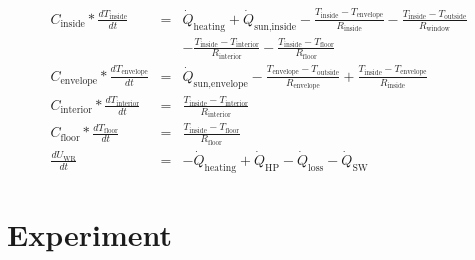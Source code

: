  \begin{align}
       \label{eq:meinModel2} 
       C_\text{inside}*\frac{d T_\text{inside}}{d t} &=& \dot{Q}_\text{heating} + \dot{Q}_\text{sun,inside} - \frac{T_\text{inside}-T_\text{envelope}}{R_\text{inside}} - \frac{T_\text{inside}-T_\text{outside}}{R_\text{window}} \\
       & &-\frac{T_\text{inside}-T_\text{interior}}{R_\text{interior}}-\frac{T_\text{inside}-T_\text{floor}}{R_\text{floor}} \nonumber\\
       C_\text{envelope}*\frac{d T_\text{envelope}}{d t} &=& \dot{Q}_\text{sun,envelope} - \frac{T_\text{envelope}-T_\text{outside}}{R_\text{envelope}} + \frac{T_\text{inside}-T_\text{envelope}}{R_\text{inside}} \nonumber \\
       C_\text{interior}*\frac{d T_\text{interior}}{d t} &=& \frac{T_\text{inside}-T_\text{interior}}{R_\text{interior}} \nonumber\\
       C_\text{floor}*\frac{d T_\text{floor}}{d t} &=& \frac{T_\text{inside}-T_\text{floor}}{R_\text{floor}} \nonumber\\
       \frac{d U_\text{WR}}{d t}&=& -\dot{Q}_\text{heating} + \dot{Q}_\text{HP} - \dot{Q}_\text{loss} - \dot{Q}_\text{SW} \nonumber
    \end{align}
    
\section{Experiment}
\label{thermalmodel}